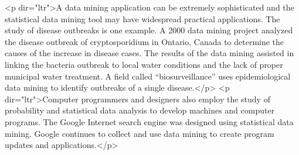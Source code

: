 <p dir="ltr">A data mining application can be extremely sophisticated and the statistical data mining tool may have widespread practical applications. The study of disease outbreaks is one example. A 2000 data mining project analyzed the disease outbreak of cryptosporidium in Ontario, Canada to determine the causes of the increase in disease cases. The results of the data mining assisted in linking the bacteria outbreak to local water conditions and the lack of proper municipal water treatment. A field called “biosurveillance” uses epidemiological data mining to identify outbreaks of a single disease.</p>
<p dir="ltr">Computer programmers and designers also employ the study of probability and statistical data analysis to develop machines and computer programs. The Google Internet search engine was designed using statistical data mining. Google continues to collect and use data mining to create program updates and applications.</p>
